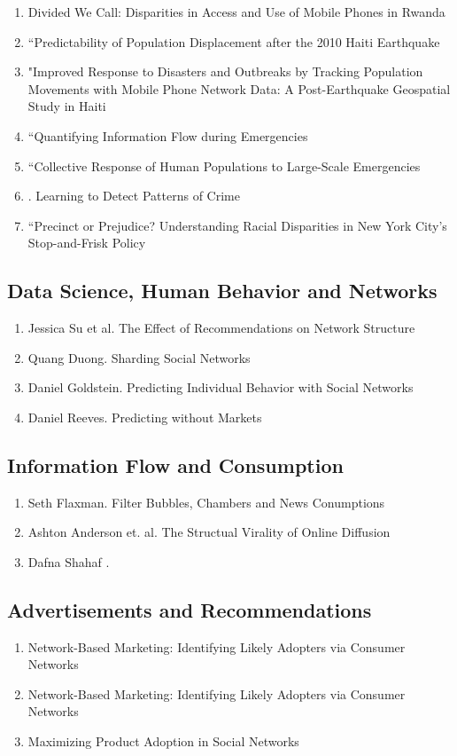 \begin{enumerate}
\item Divided We Call: Disparities in Access and Use of Mobile Phones in Rwanda
\item “Predictability of Population Displacement after the 2010 Haiti Earthquake
\item "Improved Response to Disasters and Outbreaks by Tracking Population Movements with Mobile Phone Network Data: A Post-Earthquake Geospatial Study in Haiti
\item “Quantifying Information Flow during Emergencies
\item “Collective Response of Human Populations to Large-Scale Emergencies
\item . Learning to Detect Patterns of Crime
\item “Precinct or Prejudice? Understanding Racial Disparities in New York City’s Stop-and-Frisk Policy
\end{enumerate}

\subsection{Data Science, Human Behavior and Networks}
\begin{enumerate}
\item Jessica Su et al. The Effect of Recommendations on Network Structure
\item Quang Duong. Sharding Social Networks
\item Daniel Goldstein. Predicting Individual Behavior with Social Networks
\item Daniel Reeves. Predicting without Markets
\end{enumerate}


\subsection{Information Flow and Consumption}
\begin{enumerate}
\item Seth Flaxman. Filter Bubbles, Chambers and News Conumptions
\item Ashton Anderson et. al. The Structual Virality of Online Diffusion
\item Dafna Shahaf . \cite{Shahaf:2012:CTD:2086737.2086744} 
\end{enumerate}

\subsection{Advertisements and Recommendations}
\begin{enumerate}
\item Network-Based Marketing: Identifying Likely Adopters via Consumer Networks
\item Network-Based Marketing: Identifying Likely Adopters via Consumer Networks
\item Maximizing Product Adoption in Social Networks\cite{Bhagat:2012:MPA:2124295.2124368}
\end{enumerate}